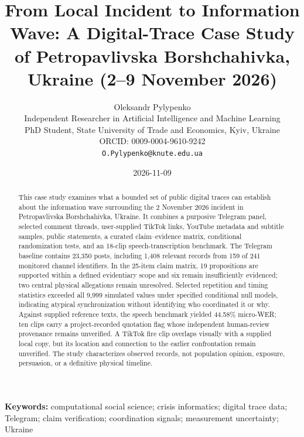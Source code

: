 \title{\LARGE From Local Incident to Information Wave: A Digital-Trace Case Study of Petropavlivska Borshchahivka, Ukraine (2--9 November 2026)}
\author{Oleksandr Pylypenko\\[0.4em]
\small Independent Researcher in Artificial Intelligence and Machine Learning\\[0.2em]
\small PhD Student, State University of Trade and Economics, Kyiv, Ukraine\\[0.2em]
\small ORCID: 0009-0004-9610-9242\\[0.2em]
\small \texttt{O.Pylypenko@knute.edu.ua}}
\date{2026-11-09}
\maketitle

\begin{abstract}
\noindent This case study examines what a bounded set of public digital traces can establish about the information wave surrounding the 2 November 2026 incident in Petropavlivska Borshchahivka, Ukraine. It combines a purposive Telegram panel, selected comment threads, user-supplied TikTok links, YouTube metadata and subtitle samples, public statements, a curated claim--evidence matrix, conditional randomization tests, and an 18-clip speech-transcription benchmark. The Telegram baseline contains 23,350 posts, including 1,408 relevant records from 159 of 241 monitored channel identifiers. In the 25-item claim matrix, 19 propositions are supported within a defined evidentiary scope and six remain insufficiently evidenced; two central physical allegations remain unresolved. Selected repetition and timing statistics exceeded all 9,999 simulated values under specified conditional null models, indicating atypical synchronization without identifying who coordinated it or why. Against supplied reference texts, the speech benchmark yielded 44.58\% micro-WER; ten clips carry a project-recorded quotation flag whose independent human-review provenance remains unverified. A TikTok fire clip overlaps visually with a supplied local copy, but its location and connection to the earlier confrontation remain unverified. The study characterizes observed records, not population opinion, exposure, persuasion, or a definitive physical timeline.
\end{abstract}

\noindent\textbf{Keywords:} computational social science; crisis informatics; digital trace data; Telegram; claim verification; coordination signals; measurement uncertainty; Ukraine

